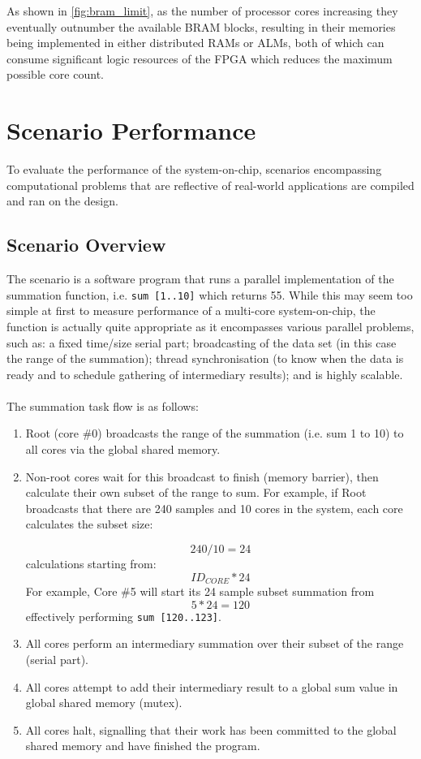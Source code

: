 As shown in \cref{fig:bram_limit}, as the number of processor cores increasing they eventually outnumber the available BRAM blocks, resulting in their memories being implemented in either distributed RAMs or ALMs, both of which can consume significant logic resources of the FPGA which reduces the maximum possible core count.

\section{Scenario Performance}
To evaluate the performance of the system-on-chip, scenarios encompassing computational problems that are reflective of real-world applications are compiled and ran on the design.

\subsection{Scenario Overview}
The scenario is a software program that runs a parallel implementation of the summation function, i.e. \verb|sum [1..10]| which returns 55. While this may seem too simple at first to measure performance of a multi-core system-on-chip, the function is actually quite appropriate as it encompasses various parallel problems, such as: a fixed time/size serial part; broadcasting of the data set (in this case the range of the summation); thread synchronisation (to know when the data is ready and to schedule gathering of intermediary results); and is highly scalable.
\\\\
The summation task flow is as follows:
\begin{enumerate}
\item Root (core \#0) broadcasts the range of the summation (i.e. sum 1 to 10) to all cores via the global shared memory.
\item Non-root cores wait for this broadcast to finish (memory barrier), then calculate their own subset of the range to sum. For example, if Root broadcasts that there are 240 samples and 10 cores in the system, each core calculates the subset size:

\begin{equation}
240/10 = 24
\end{equation} calculations starting from:
\begin{equation}
{ID_{CORE}} * 24
\end{equation}
For example, Core \#5 will start its 24 sample subset summation from
\begin{equation}
5 * 24 = 120
\end{equation}
effectively performing \verb|sum [120..123]|.

\item All cores perform an intermediary summation over their subset of the range (serial part).
\item All cores attempt to add their intermediary result to a global sum value in global shared memory (mutex).
\item All cores halt, signalling that their work has been committed to the global shared memory and have finished the program.
\end{enumerate}

